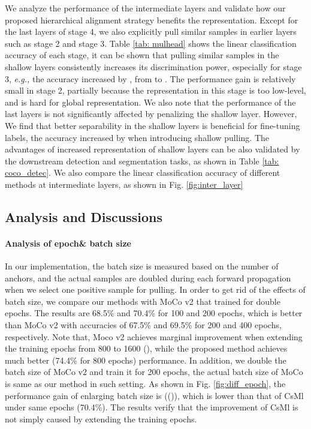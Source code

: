 \documentclass[10pt,twocolumn,letterpaper]{article}
\begin{document}
We analyze the performance of the intermediate layers and validate how our proposed hierarchical alignment strategy benefits the representation. Except for the last layers of stage 4, we also explicitly pull similar samples in earlier layers such as stage 2 and stage 3. Table \ref{tab: mulhead} shows the linear classification accuracy of each stage, it can be shown that pulling similar samples in the shallow layers consistently increases its discrimination power, especially for stage 3, \emph{e.g.,} the accuracy increased by , from  to . The performance gain is relatively small in stage 2, partially because the representation in this stage is too low-level, and is hard for global representation. We also note that the performance of the last layers is not significantly affected by penalizing the shallow layer. However, We find that better separability in the shallow layers is beneficial for fine-tuning  labels, the accuracy increased by  when introducing shallow pulling. The advantages of increased representation of shallow layers can be also validated by the downstream detection and segmentation tasks, as shown in Table \ref{tab: coco_detec}. We also compare the linear classification accuracy of different methods at intermediate layers, as shown in Fig. \ref{fig:inter_layer} 






\subsection{Analysis and Discussions}



\paragraph{Analysis of epoch\& batch size} In our implementation, the batch size is measured based on the number of anchors, and the actual samples are doubled during each forward propagation when we select one positive sample for pulling. In order to get rid of the effects of batch size, we compare our methods with MoCo v2 that trained for double epochs. The results are 68.5\% and 70.4\% for 100 and 200 epochs, which is better than MoCo v2 with accuracies of 67.5\% and 69.5\% for 200 and 400 epochs, respectively. Note that, Moco v2 achieves marginal improvement when extending the training epochs from 800 to 1600 (), while the proposed method achieves much better (74.4\% for 800 epochs) performance. In addition, we double the batch size of MoCo v2 and train it for 200 epochs, the actual batch size of MoCo is same as our method in such setting. As shown in Fig. \ref{fig:diff_epoch}, the performance gain of enlarging batch size is  (()), which is lower than that of CsMl under same epochs (70.4\%). The results verify that the improvement of CsMl is not simply caused by extending the training epochs.
\end{document}

